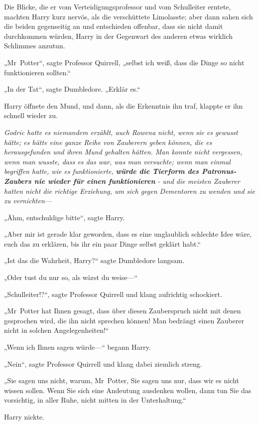 {Die Blicke, die er vom Verteidigungsprofessor und vom Schulleiter erntete, machten Harry kurz nervös, als die verschüttete Limolasste; aber dann sahen sich die beiden gegenseitig an und entschieden offenbar, dass sie nicht damit durchkommen würden, Harry in der Gegenwart des anderen etwas wirklich Schlimmes anzutun.

„Mr~Potter“, sagte Professor Quirrell, „selbst ich weiß, dass die Dinge so nicht funktionieren sollten.“

„In der Tat“, sagte Dumbledore. „Erklär es.“

Harry öffnete den Mund, und dann, als die Erkenntnis ihn traf, klappte er ihn schnell wieder zu.

\emph{Godric hatte es niemandem erzählt, auch Rowena nicht, wenn sie es gewusst hätte; es hätte eine ganze Reihe von Zauberern geben können, die es herausgefunden und ihren Mund gehalten hätten. Man konnte nicht vergessen, wenn man wusste, dass es das war, was man versuchte; wenn man einmal begriffen hatte, wie es funktionierte,} \textbf{\emph{würde die Tierform des Patronus-Zaubers nie wieder für einen funktionieren}} \emph{- und die meisten Zauberer hatten nicht die richtige Erziehung, um sich gegen Dementoren zu wenden und sie zu vernichten—}

„Ähm, entschuldige bitte“, sagte Harry.

„Aber mir ist gerade klar geworden, dass es eine unglaublich schlechte Idee wäre, euch das zu erklären, bis ihr ein paar Dinge selbst geklärt habt.“

„Ist das die Wahrheit, Harry?“ sagte Dumbledore langsam.

„Oder tust du nur so, als wärst du weise—“

„Schulleiter!?“, sagte Professor Quirrell und klang aufrichtig schockiert.

„Mr~Potter hat Ihnen gesagt, dass über diesen Zauberspruch nicht mit denen gesprochen wird, die ihn nicht sprechen können! Man bedrängt einen Zauberer nicht in solchen Angelegenheiten!“

„Wenn ich Ihnen sagen würde—“ begann Harry.

„Nein“, sagte Professor Quirrell und klang dabei ziemlich streng.

„Sie sagen uns nicht, warum, Mr~Potter, Sie sagen uns nur, dass wir es nicht wissen sollen. Wenn Sie sich eine Andeutung ausdenken wollen, dann tun Sie das vorsichtig, in aller Ruhe, nicht mitten in der Unterhaltung.“

Harry nickte.

}
